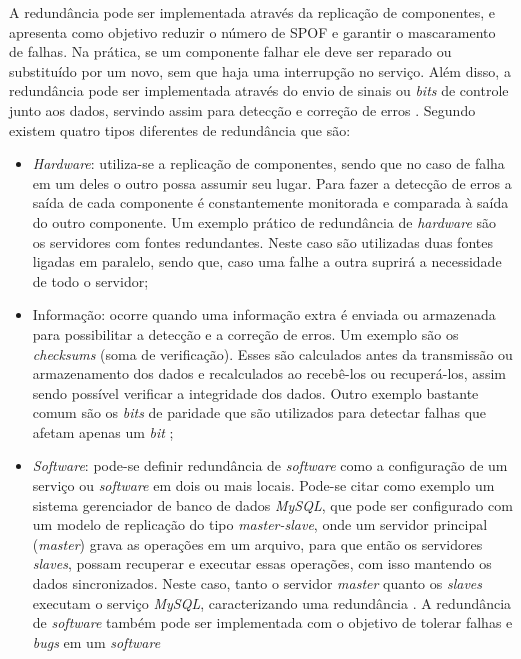 A redundância pode ser implementada através da replicação de componentes, e apresenta como objetivo reduzir o número de \ac{SPOF} e garantir 
o mascaramento de falhas. Na prática, se um componente falhar ele deve ser reparado ou substituído por um novo, sem que haja uma 
interrupção no serviço. Além disso, a redundância pode ser implementada através do envio de sinais ou \textit{bits} de controle junto aos dados, 
servindo assim para detecção e correção de erros \cite{weber2002}. Segundo \cite{norvag2000} existem quatro tipos diferentes 
de redundância que são:
\begin{itemize}
 \item \textit{Hardware}: utiliza-se a replicação de componentes, sendo que no caso de falha em um deles o outro possa assumir seu lugar. 
 Para fazer a detecção de erros a saída de cada componente é constantemente monitorada e comparada à saída do outro componente.
 Um exemplo prático de redundância de \textit{hardware} são os servidores com fontes redundantes. Neste caso são utilizadas duas fontes 
 ligadas em paralelo, sendo que, caso uma falhe a outra suprirá a necessidade de todo o servidor;
 \item Informação: ocorre quando uma informação extra é enviada ou armazenada para possibilitar a detecção e a correção de erros.
 Um exemplo são os \textit{checksums} (soma de verificação). Esses são calculados antes da transmissão ou armazenamento dos dados 
 e recalculados ao recebê-los ou recuperá-los, assim sendo possível verificar a integridade dos dados. Outro exemplo bastante comum são os 
 \textit{bits} de paridade que são utilizados para detectar falhas que afetam apenas um \textit{bit} \cite{weber2002};
 \item \textit{Software}: pode-se definir redundância de \textit{software} como a configuração de um serviço ou \textit{software} em
 dois ou mais locais. Pode-se citar como exemplo um sistema gerenciador de banco de dados \textit{MySQL}, que pode ser configurado 
 com um modelo de replicação do tipo \textit{master-slave}, onde um servidor principal (\textit{master}) grava as operações em um arquivo, 
 para que então os servidores \textit{slaves}, possam recuperar e executar essas operações, com isso mantendo os dados sincronizados. Neste caso, 
 tanto o servidor \textit{master} quanto os \textit{slaves} executam o serviço \textit{MySQL}, caracterizando uma redundância \cite{viana201}. 
 A redundância de \textit{software} também pode ser implementada com o objetivo de tolerar falhas e \textit{bugs} em um \textit{software} 

\end{itemize}

